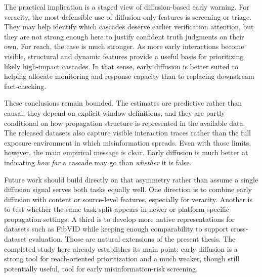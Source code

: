 The practical implication is a staged view of diffusion-based early warning. For veracity, the most defensible use of diffusion-only features is screening or triage. They may help identify which cascades deserve earlier verification attention, but they are not strong enough here to justify confident truth judgments on their own. For reach, the case is much stronger. As more early interactions become visible, structural and dynamic features provide a useful basis for prioritizing likely high-impact cascades. In that sense, early diffusion is better suited to helping allocate monitoring and response capacity than to replacing downstream fact-checking.

These conclusions remain bounded. The estimates are predictive rather than causal, they depend on explicit window definitions, and they are partly conditional on how propagation structure is represented in the available data. The released datasets also capture visible interaction traces rather than the full exposure environment in which misinformation spreads. Even with those limits, however, the main empirical message is clear. Early diffusion is much better at indicating \emph{how far} a cascade may go than \emph{whether} it is false.

Future work should build directly on that asymmetry rather than assume a single diffusion signal serves both tasks equally well. One direction is to combine early diffusion with content or source-level features, especially for veracity. Another is to test whether the same task split appears in newer or platform-specific propagation settings. A third is to develop more native representations for datasets such as FibVID while keeping enough comparability to support cross-dataset evaluation. Those are natural extensions of the present thesis. The completed study here already establishes its main point: early diffusion is a strong tool for reach-oriented prioritization and a much weaker, though still potentially useful, tool for early misinformation-risk screening.
